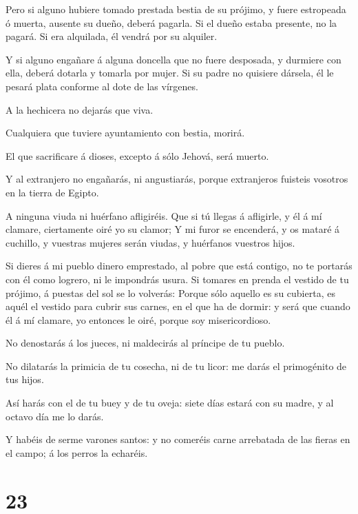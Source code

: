  Pero si alguno hubiere tomado prestada bestia de su
prójimo, y fuere estropeada ó muerta, ausente su dueño, deberá pagarla.
 Si el dueño estaba presente, no la pagará. Si era
alquilada, él vendrá por su alquiler.

 Y si alguno engañare á alguna doncella que no fuere
desposada, y durmiere con ella, deberá dotarla y tomarla por mujer.
 Si su padre no quisiere dársela, él le pesará plata
conforme al dote de las vírgenes.

 A la hechicera no dejarás que viva.

 Cualquiera que tuviere ayuntamiento con bestia, morirá.

 El que sacrificare á dioses, excepto á sólo Jehová, será
muerto.

 Y al extranjero no engañarás, ni angustiarás, porque
extranjeros fuisteis vosotros en la tierra de Egipto.

 A ninguna viuda ni huérfano afligiréis.  Que
si tú llegas á afligirle, y él á mí clamare, ciertamente oiré yo su
clamor;  Y mi furor se encenderá, y os mataré á cuchillo, y
vuestras mujeres serán viudas, y huérfanos vuestros hijos.

 Si dieres á mi pueblo dinero emprestado, al pobre que está
contigo, no te portarás con él como logrero, ni le impondrás usura.
 Si tomares en prenda el vestido de tu prójimo, á puestas
del sol se lo volverás:  Porque sólo aquello es su
cubierta, es aquél el vestido para cubrir sus carnes, en el que ha de
dormir: y será que cuando él á mí clamare, yo entonces le oiré, porque
soy misericordioso.

 No denostarás á los jueces, ni maldecirás al príncipe de
tu pueblo.

 No dilatarás la primicia de tu cosecha, ni de tu licor: me
darás el primogénito de tus hijos.

 Así harás con el de tu buey y de tu oveja: siete días
estará con su madre, y al octavo día me lo darás.

 Y habéis de serme varones santos: y no comeréis carne
arrebatada de las fieras en el campo; á los perros la echaréis.

\hypertarget{section-22}{%
\section{23}\label{section-22}}

